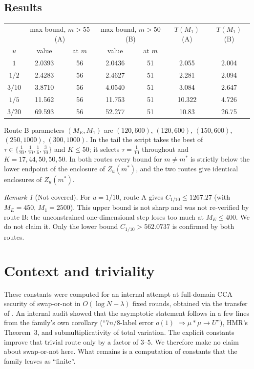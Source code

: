 \documentclass[11pt]{amsart}
\theoremstyle{remark}
\newtheorem{remark}[theorem]{Remark}
\begin{document}
\subsection*{Results}
\begin{center}
\begin{tabular}{c|cc|cc|cc}
\toprule
& \multicolumn{2}{c|}{max bound, $m>55$ (A)} & \multicolumn{2}{c|}{max bound, $m>50$ (B)} & $T(M_1)$ (A) & $T(M_1)$ (B)\\
$u$ & value & at $m$ & value & at $m$ & & \\\midrule
$1$ & 2.0393 & 56 & 2.0436 & 51 & 2.055 & 2.004\\
$1/2$ & 2.4283 & 56 & 2.4627 & 51 & 2.281 & 2.094\\
$3/10$ & 3.8710 & 56 & 4.0540 & 51 & 3.084 & 2.647\\
$1/5$ & 11.562 & 56 & 11.753 & 51 & 10.322 & 4.726\\
$3/20$ & 69.593 & 56 & 52.277 & 51 & 10.83 & 26.75\\\bottomrule
\end{tabular}
\end{center}
Route B parameters $(M_E,M_1)$ are $(120,600)$, $(120,600)$, $(150,600)$, $(250,1000)$, $(300,1000)$. In
the tail the script takes the best of $\tau\in\{\frac1{20},\frac1{10},\frac15,\frac3{10}\}$ and $K\le50$; it selects $\tau=\frac1{10}$ throughout and $K=17,44,50,50,50$. In both routes every bound for $m\ne m^*$ is strictly below the lower
endpoint of the enclosure of $Z_u(m^*)$, and the two routes give identical enclosures of $Z_u(m^*)$.

\begin{remark}[Not covered]
For $u=1/10$, route A gives $C_{1/10}\le1267.27$ (with $M_E=450$, $M_1=2500$). This upper bound is not sharp
and was not re-verified by route B: the unconstrained one-dimensional step loses too much at
$M_E\le400$. We do not claim it. Only the lower bound $C_{1/10}>562.0737$ is confirmed by both routes.
\end{remark}

\section{Context and triviality}
These constants were computed for an internal attempt at full-domain CCA security of swap-or-not
\cite{HMR12} in $O(\log N+\lambda)$ fixed rounds, obtained via the transfer of \cite{oai-transfer}. An
internal audit showed that the asymptotic statement follows in a few lines from the family's own
corollary (``$7n/8$-label error $o(1)$ $\Rightarrow\mu*\mu\to U$''), HMR's Theorem~3, and submultiplicativity
of total variation. The explicit constants improve that trivial route only by a factor of 3--5. We
therefore make no claim about swap-or-not here. What remains is a computation of constants that the
family leaves as ``finite''.
\end{document}
